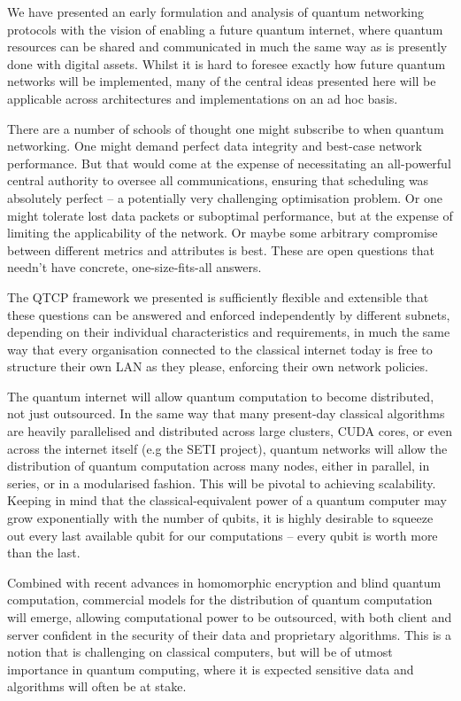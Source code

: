 \documentclass[aps, rmp, twocolumn, amsmath, amssymb, nofootinbib, superscriptaddress, longbibliography, floatfix, table-of-contents, eqsecnum]{revtex4-1}
\begin{document}
We have presented an early formulation and analysis of quantum networking protocols with the vision of enabling a future quantum internet, where quantum resources can be shared and communicated in much the same way as is presently done with digital assets. Whilst it is hard to foresee exactly how future quantum networks will be implemented, many of the central ideas presented here will be applicable across architectures and implementations on an ad hoc basis.

There are a number of schools of thought one might subscribe to when quantum networking. One might demand perfect data integrity and best-case network performance. But that would come at the expense of necessitating an all-powerful central authority to oversee all communications, ensuring that scheduling was absolutely perfect -- a potentially very challenging optimisation problem. Or one might tolerate lost data packets or suboptimal performance, but at the expense of limiting the applicability of the network. Or maybe some arbitrary compromise between different metrics and attributes is best. These are open questions that needn't have concrete, one-size-fits-all answers.

The QTCP framework we presented is sufficiently flexible and extensible that these questions can be answered and enforced independently by different subnets, depending on their individual characteristics and requirements, in much the same way that every organisation connected to the classical internet today is free to structure their own LAN as they please, enforcing their own network policies.

The quantum internet will allow quantum computation to become distributed, not just outsourced. In the same way that many present-day classical algorithms are heavily parallelised and distributed across large clusters, CUDA cores, or even across the internet itself (e.g the SETI project), quantum networks will allow the distribution of quantum computation across many nodes, either in parallel, in series, or in a modularised fashion. This will be pivotal to achieving scalability. Keeping in mind that the classical-equivalent power of a quantum computer may grow exponentially with the number of qubits, it is highly desirable to squeeze out every last available qubit for our computations -- every qubit is worth more than the last.

Combined with recent advances in homomorphic encryption and blind quantum computation, commercial models for the distribution of quantum computation will emerge, allowing computational power to be outsourced, with both client and server confident in the security of their data and proprietary algorithms. This is a notion that is challenging on classical computers, but will be of utmost importance in quantum computing, where it is expected sensitive data and algorithms will often be at stake.
\end{document}
